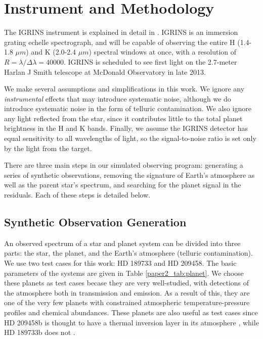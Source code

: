 \section{Instrument and Methodology}
\label{paper2_sec:method}
The IGRINS instrument is explained in detail in \cite{IGRINS}. IGRINS
is an immersion grating echelle spectrograph, and will
be capable of observing the entire H (1.4-1.8 $\mu m$) and K (2.0-2.4 $\mu m$) spectral windows at once,
with a resolution of $R=\lambda / \Delta \lambda = 40000$. IGRINS is
scheduled to see first light on the 2.7-meter Harlan J Smith telescope at McDonald
Observatory in late 2013.

We make several assumptions and simplifications in this work. We
ignore any \emph{instrumental} effects that may introduce systematic noise, although we do introduce systematic noise in the form of telluric contamination. We also ignore any light reflected from the star, since it contributes little to the total planet brightness in the H and K bands. Finally, we assume the IGRINS detector has equal sensitivity to all wavelengths of light, so the signal-to-noise ratio is set only by the light from the target.

There are three main steps in our simulated observing program: generating
a series of synthetic observations, removing the signature of Earth's
atmosphere as well as the parent star's spectrum, and searching for
the planet signal in the residuals. Each of these steps is detailed
below.

\subsection{Synthetic Observation Generation}
\label{paper2_sec:obsgen}
An observed spectrum of a star and planet system can be divided into
three parts: the star, the planet, and the Earth's atmosphere
(telluric contamination). We use two test cases for this work: HD 189733 and HD 209458. The basic parameters of the systems are given in Table \ref{paper2_tab:planet}. We choose these planets as test cases becase they are very well-studied, with detections of the atmosphere both in transmission and emission. As a result of this, they are one of the very few planets with constrained atmospheric temperature-pressure profiles and chemical abundances. These planets are also useful as test cases since HD 209458b is thought to have a thermal inversion layer in its atmosphere \citep{Knutson2008}, while HD 189733b does not \citep{Char2008}.

